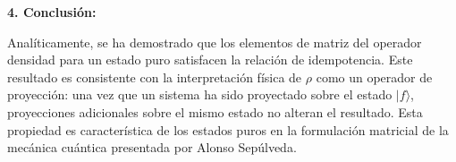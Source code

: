 \documentclass[a4paper]{article}
\begin{document}
\textbf{4. Conclusión:}

Analíticamente, se ha demostrado que los elementos de matriz del operador densidad para un estado puro satisfacen la relación de idempotencia. Este resultado es consistente con la interpretación física de $\rho$ como un operador de proyección: una vez que un sistema ha sido proyectado sobre el estado $|f\rangle$, proyecciones adicionales sobre el mismo estado no alteran el resultado. Esta propiedad es característica de los estados puros en la formulación matricial de la mecánica cuántica presentada por Alonso Sepúlveda.



 
\end{document}
